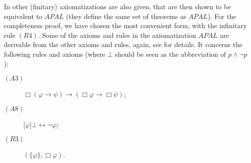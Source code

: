 \documentclass{article}[12pt]
\renewcommand{\phi}{\varphi}
\begin{document}
In \cite{balbianietal:2008} other (finitary) axiomatizations are also given, that are then shown to be equivalent to $APAL$ (they define the same set of theorems as $APAL$). For the completeness proof, we have chosen the most convenient form, with the infinitary rule $(R4)$.  Some of the axioms and rules in the axiomatization $APAL$ are derivable from the other axioms and rules, again, see \cite{balbianietal:2008} for details. It concerns the following rules and axioms (where $\bot$ should be seen as the abbreviation of $p \wedge \neg p$):
\begin{description}
\item[$(A3)$] $\Box(\phi\rightarrow\psi)\rightarrow(\Box\phi\rightarrow\Box\psi)$;
\item[$(A8)$] $\lbrack\phi\rbrack\bot\leftrightarrow\neg\phi$; 
\item[$(R3)$] $(\{\phi\},\Box\phi)$. \end{description}
\end{document}
